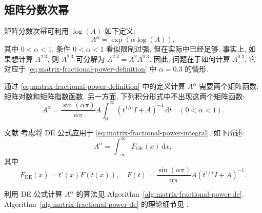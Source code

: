 \subsection{{矩阵分数次幂}}\label{sec:matrix-fractional-power}\label{srcpage:printed-208}

{矩阵分数次幂可利用 $\log(A)$ 如下定义:}
\begin{equation}\label{eq:matrix-fractional-power-definition}A^\alpha=\exp(\alpha\log(A)),\end{equation}
{其中 $0<\alpha<1$. 条件 $0<\alpha<1$ 看似限制过强, 但在实际中已经足够. 事实上, 如果想计算 $A^{2.3}$, 则 $A^{2.3}$ 可分解为 $A^{2.3}=A^2A^{0.3}$. 因此, 问题在于如何计算 $A^{0.3}$, 它对应于 \eqref{eq:matrix-fractional-power-definition} 中 $\alpha=0.3$ 的情形.}

{通过 \eqref{eq:matrix-fractional-power-definition} 中的定义计算 $A^\alpha$ 需要两个矩阵函数: 矩阵对数和矩阵指数函数. 另一方面, 下列积分形式中不出现这两个矩阵函数:}
\begin{equation}\label{eq:matrix-fractional-power-integral}A^\alpha=\frac{\sin(\alpha\pi)}{\alpha\pi}A\int_0^\infty(t^{1/\alpha}I+A)^{-1}\,\mathrm{d}t\quad(0<\alpha<1).\end{equation}

{文献  考虑将 DE 公式应用于 \eqref{eq:matrix-fractional-power-integral}, 如下所述:}
\begin{equation}\label{eq:matrix-fractional-power-de-integral}A^\alpha=\int_{-\infty}^\infty F_{\mathrm{DE}}(x)\,\mathrm{d}x,\end{equation}
{其中}
\begin{equation}\label{eq:matrix-fractional-power-de-integrand}F_{\mathrm{DE}}(x)=t'(x)F(t(x)),\quad F(t)=\frac{\sin(\alpha\pi)}{\alpha\pi}A(t^{1/\alpha}I+A)^{-1}.\end{equation}

{利用 DE 公式计算 $A^\alpha$ 的算法见 Algorithm~\ref{alg:matrix-fractional-power-de}. Algorithm~\ref{alg:matrix-fractional-power-de} 的理论细节见 .}

